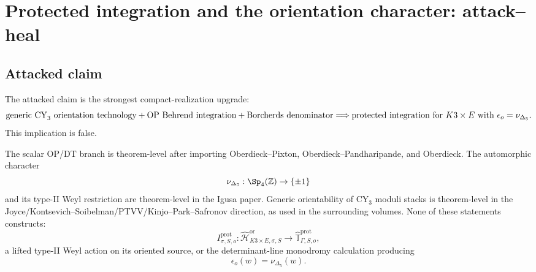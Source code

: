 \section{Protected integration and the orientation character: attack--heal}
\label{sec:agent15d-protected-integration-orientation-character}

\providecommand{\Z}{\mathbb Z}
\providecommand{\C}{\mathbb C}
\providecommand{\La}{\Lambda}
\providecommand{\Ran}{\operatorname{Ran}}
\providecommand{\RHom}{\operatorname{RHom}}
\providecommand{\sdet}{\operatorname{sdet}}
\providecommand{\CoHA}{\operatorname{CoHA}}
\providecommand{\Hall}{\mathcal H}
\providecommand{\BM}{\operatorname{BM}}
\providecommand{\Crit}{\operatorname{Crit}}
\providecommand{\MHM}{\operatorname{MHM}}
\providecommand{\Perf}{\operatorname{Perf}}
\providecommand{\Prim}{\operatorname{Prim}}
\providecommand{\sdim}{\operatorname{sdim}}
\providecommand{\Spch}{\mathrm{Sp}^{\mathrm{ch}}}
\providecommand{\hCS}{\mathrm{hCS}}
\providecommand{\BV}{\mathrm{BV}}
\providecommand{\TS}{\mathrm{TS}}
\providecommand{\Deltafive}{\Delta_5}
\providecommand{\nuDelta}{\nu_{\Delta_5}}
\providecommand{\epsor}{\epsilon_o}
\providecommand{\gDelta}{\mathfrak g_{\Delta_5}}

\subsection{Attacked claim}

The attacked claim is the strongest compact-realization upgrade:
\[
  \hbox{generic CY}_3\hbox{ orientation technology}
  + \hbox{OP Behrend integration}
  + \hbox{Borcherds denominator}
  \Longrightarrow
  \hbox{protected integration for }K3\times E
  \hbox{ with }\epsor=\nuDelta .
\]
This implication is false.

The scalar OP/DT branch is theorem-level after importing
Oberdieck--Pixton, Oberdieck--Pandharipande, and Oberdieck.  The
automorphic character
\[
  \nuDelta:\Sp_4(\Z)\to\{\pm1\}
\]
and its type-II Weyl restriction are theorem-level in the Igusa paper.
Generic orientability of CY\(_3\) moduli stacks is theorem-level in the
Joyce/Kontsevich--Soibelman/PTVV/Kinjo--Park--Safronov direction, as
used in the surrounding volumes.  None of these statements constructs:
\[
  I^{\mathrm{prot}}_{\sigma,S,o}:
  \widehat{\Hall}^{\mathrm{or}}_{K3\times E,\sigma,S}
  \longrightarrow
  \widehat{\mathbb T}^{\mathrm{prot}}_{\Gamma,S,o},
\]
a lifted type-II Weyl action on its oriented source, or the
determinant-line monodromy calculation producing
\[
  \epsor(w)=\nuDelta(w).
\]

